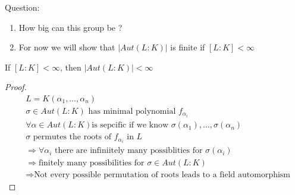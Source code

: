\documentclass{article}
\begin{document}
Question: \begin{enumerate}
    \item How big can this group be ?
    \item For now we will show that $|Aut(L:K)|$ is finite if $[L : K] < \infty$
\end{enumerate}
\begin{theorem}
    If $[L:K] < \infty$, then $|Aut(L:K)| < \infty$
    \begin{proof}
        \leavevmode \\ 
        \begin{align*}
            &L = K(\alpha_1, \dots, \alpha_n) \\ 
            &\sigma \in Aut(L:K)  \text{ has minimal polynomial } f_{\alpha_i}\\
            &\forall \alpha \in Aut(L:K)  \text {is sepcific if we know } \sigma(\alpha_1), \dots, \sigma(\alpha_n) \\ 
            &\sigma \text{ permutes the roots of } f_{\alpha_i} \text{ in } L \\
            &\Rightarrow \forall \alpha_i \text{ there are infiniitely many possiblities for } \sigma(\alpha_i) \\
            &\Rightarrow \text{finitely many possibilities for } \sigma \in Aut(L:K) \\
            &\Rightarrow \text{Not every possible permutation of roots leads to a field automorphism}
        \end{align*}
    \end{proof}
    
\end{theorem}
\end{document}
